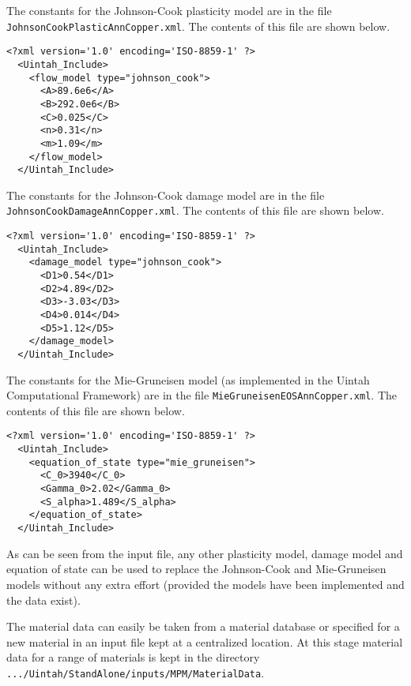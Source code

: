   The constants for the Johnson-Cook plasticity model are in the file
  \verb+JohnsonCookPlasticAnnCopper.xml+.  The contents of this file are
  shown below.
  \begin{Verbatim}[fontsize=\footnotesize]
  <?xml version='1.0' encoding='ISO-8859-1' ?>
  <Uintah_Include>
    <flow_model type="johnson_cook">
      <A>89.6e6</A>
      <B>292.0e6</B>
      <C>0.025</C>
      <n>0.31</n>
      <m>1.09</m>
    </flow_model>
  </Uintah_Include>
  \end{Verbatim}

  The constants for the Johnson-Cook damage model are in the file
  \verb+JohnsonCookDamageAnnCopper.xml+.  The contents of this file are
  shown below.
  \begin{Verbatim}[fontsize=\footnotesize]
  <?xml version='1.0' encoding='ISO-8859-1' ?>
  <Uintah_Include>
    <damage_model type="johnson_cook">
      <D1>0.54</D1>
      <D2>4.89</D2>
      <D3>-3.03</D3>
      <D4>0.014</D4>
      <D5>1.12</D5>
    </damage_model>
  </Uintah_Include>
  \end{Verbatim}

  The constants for the Mie-Gruneisen model (as implemented in the
  Uintah Computational Framework) are in the file
  \verb+MieGruneisenEOSAnnCopper.xml+.  The contents of this file are
  shown below.
  \begin{Verbatim}[fontsize=\footnotesize]
  <?xml version='1.0' encoding='ISO-8859-1' ?>
  <Uintah_Include>
    <equation_of_state type="mie_gruneisen">
      <C_0>3940</C_0>
      <Gamma_0>2.02</Gamma_0>
      <S_alpha>1.489</S_alpha>
    </equation_of_state>
  </Uintah_Include>
  \end{Verbatim}

  As can be seen from the input file, any other plasticity model, damage
  model and equation of state can be used to replace the Johnson-Cook
  and Mie-Gruneisen models without any extra effort (provided the models
  have been implemented and the data exist).

  The material data can easily be taken from a material database or specified
  for a new material in an input file kept at a centralized location.  At this
  stage material data for a range of materials is kept in the directory
  \verb|.../Uintah/StandAlone/inputs/MPM/MaterialData|.


